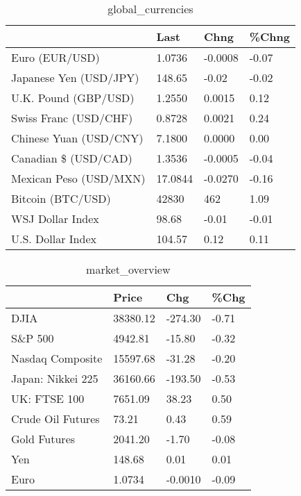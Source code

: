 \documentclass{article}%
\begin{document}
%


\begin{table}[htbp]%
\caption{global\_currencies}%
\centering%
\begin{adjustbox}{width=1\textwidth}%
\begin{tabular}{llll}
\toprule
                       &    Last &    Chng & \%Chng \\
\midrule
        Euro (EUR/USD) &  1.0736 & -0.0008 & -0.07 \\
Japanese Yen (USD/JPY) &  148.65 &   -0.02 & -0.02 \\
  U.K. Pound (GBP/USD) &  1.2550 &  0.0015 &  0.12 \\
 Swiss Franc (USD/CHF) &  0.8728 &  0.0021 &  0.24 \\
Chinese Yuan (USD/CNY) &  7.1800 &  0.0000 &  0.00 \\
  Canadian \$ (USD/CAD) &  1.3536 & -0.0005 & -0.04 \\
Mexican Peso (USD/MXN) & 17.0844 & -0.0270 & -0.16 \\
     Bitcoin (BTC/USD) &   42830 &     462 &  1.09 \\
      WSJ Dollar Index &   98.68 &   -0.01 & -0.01 \\
     U.S. Dollar Index &  104.57 &    0.12 &  0.11 \\
\bottomrule
\end{tabular}
%
\end{adjustbox}%
\end{table}

%


\begin{table}[htbp]%
\caption{market\_overview}%
\centering%
\begin{adjustbox}{width=1\textwidth}%
\begin{tabular}{llll}
\toprule
                  &    Price &     Chg &  \%Chg \\
\midrule
             DJIA & 38380.12 & -274.30 & -0.71 \\
          S\&P 500 &  4942.81 &  -15.80 & -0.32 \\
 Nasdaq Composite & 15597.68 &  -31.28 & -0.20 \\
Japan: Nikkei 225 & 36160.66 & -193.50 & -0.53 \\
     UK: FTSE 100 &  7651.09 &   38.23 &  0.50 \\
Crude Oil Futures &    73.21 &    0.43 &  0.59 \\
     Gold Futures &  2041.20 &   -1.70 & -0.08 \\
              Yen &   148.68 &    0.01 &  0.01 \\
             Euro &   1.0734 & -0.0010 & -0.09 \\
\bottomrule
\end{tabular}
%
\end{adjustbox}%
\end{table}

%
\end{document}

